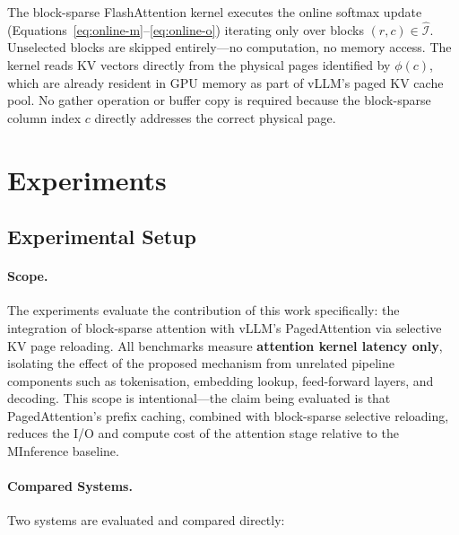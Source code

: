 \documentclass{article}
\begin{document}
The block-sparse FlashAttention kernel executes the online softmax update
(Equations~\ref{eq:online-m}--\ref{eq:online-o}) iterating only over
blocks $(r, c) \in \hat{\mathcal{I}}$. Unselected blocks are skipped
entirely---no computation, no memory access. The kernel reads KV vectors
directly from the physical pages identified by $\phi(c)$, which are
already resident in GPU memory as part of vLLM's paged KV cache pool.
No gather operation or buffer copy is required because the block-sparse
column index $c$ directly addresses the correct physical page.

\section{Experiments}
\label{sec:experiments}

\subsection{Experimental Setup}

\paragraph{Scope.}
The experiments evaluate the contribution of this work specifically: the
integration of block-sparse attention with vLLM's PagedAttention via
selective KV page reloading. All benchmarks measure \textbf{attention
kernel latency only}, isolating the effect of the proposed mechanism from
unrelated pipeline components such as tokenisation, embedding lookup,
feed-forward layers, and decoding. This scope is intentional---the claim
being evaluated is that PagedAttention's prefix caching, combined with
block-sparse selective reloading, reduces the I/O and compute cost of the
attention stage relative to the MInference baseline.

\paragraph{Compared Systems.}
Two systems are evaluated and compared directly:
\end{document}
